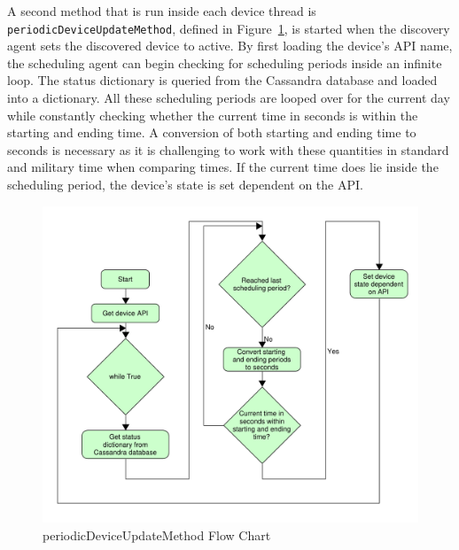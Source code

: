A second method that is run inside each device thread is \texttt{periodicDeviceUpdateMethod}, defined in Figure~\ref{fig:periodicDeviceUpdateMethod}, is started when the discovery agent sets the discovered device to active. By first loading the device's API name, the scheduling agent can begin checking for scheduling periods inside an infinite loop. The status dictionary is queried from the Cassandra database and loaded into a dictionary. All these scheduling periods are looped over for the current day while constantly checking whether the current time in seconds is within the starting and ending time. A conversion of both starting and ending time to seconds is necessary as it is challenging to work with these quantities in standard and military time when comparing times. If the current time does lie inside the scheduling period, the device's state is set dependent on the API. 
\begin{figure}[H]
    \centering
    \includegraphics[scale=0.5]{figs/periodicDeviceUpdateMethod.pdf}
    \caption{periodicDeviceUpdateMethod Flow Chart}
    \label{fig:periodicDeviceUpdateMethod}
\end{figure}

